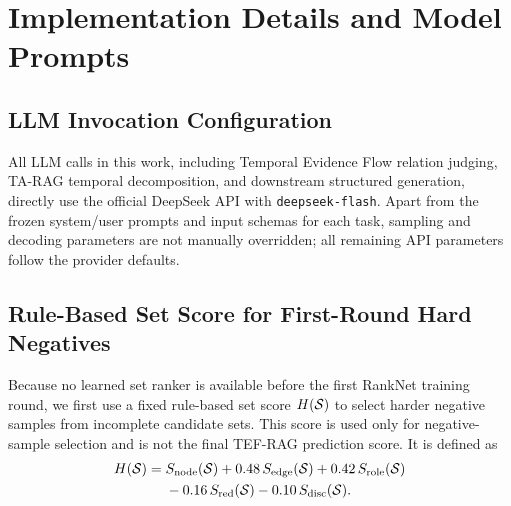 \section{Implementation Details and Model Prompts}
\label{app:implementation}

\subsection{LLM Invocation Configuration}
\label{app:llm_config}

All LLM calls in this work, including Temporal Evidence Flow relation judging,
TA-RAG temporal decomposition, and downstream structured generation, directly use the official DeepSeek API with \texttt{deepseek-flash}.
Apart from the frozen system/user prompts and input schemas for each task,
sampling and decoding parameters are not manually overridden; all remaining API parameters follow the provider defaults.


\subsection{Rule-Based Set Score for First-Round Hard Negatives}
\label{app:hand_score}

Because no learned set ranker is available before the first RankNet training round, we first use a fixed rule-based set score
$H(\mathcal{S})$ to select harder negative samples from incomplete candidate sets. This score is used only for negative-sample selection and is not the final TEF-RAG prediction score. It is defined as
\begin{equation}
\begin{aligned}
H(\mathcal{S})
={}&S_{\mathrm{node}}(\mathcal{S})
+0.48\,S_{\mathrm{edge}}(\mathcal{S})
+0.42\,S_{\mathrm{role}}(\mathcal{S})\\
&-0.16\,S_{\mathrm{red}}(\mathcal{S})
-0.10\,S_{\mathrm{disc}}(\mathcal{S}).
\end{aligned}
\label{eq:appendix_hand_score}
\end{equation}

